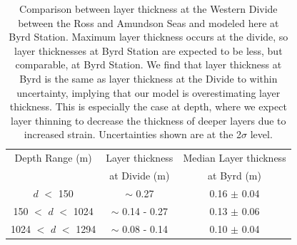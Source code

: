 \documentclass[12pt]{article}
\begin{document}
\begin{table}[ht]
\centering
\begin{tabular}{|c|c|c|}
\hline
Depth Range (m) & \multicolumn{1}{c|}{Layer thickness} & \multicolumn{1}{c|}{Median Layer thickness}  \\
& at Divide (m) & at Byrd  (m)\\
\hline
$\textit{d}$ $<$ 150 & $\sim$ 0.27 &  0.16 $\pm$ 0.04\\
150 $<$ $\textit{d}$ $<$ 1024 & $\sim$ 0.14 - 0.27 & 0.13  $\pm$ 0.06\\
1024 $<$ $\textit{d}$ $<$ 1294 & $\sim$ 0.08 - 0.14 & 0.10 $\pm$ 0.04\\
\hline
\end{tabular}
\captionsetup{width=.9\textwidth}
\caption{Comparison between layer thickness at the Western Divide between the Ross and Amundson Seas \citep{neumann2008} and modeled here at Byrd Station. Maximum layer thickness occurs at the divide, so layer thicknesses at Byrd Station are expected to be less, but comparable, at Byrd Station. We find that layer thickness at Byrd is the same as layer thickness at the Divide to within uncertainty, implying that our model is overestimating layer thickness. This is especially the case at depth, where we expect layer thinning to decrease the thickness of deeper layers due to increased strain. Uncertainties shown are at the 2$\sigma$ level.}
\label{table:accums}
\end{table}

\end{document}

